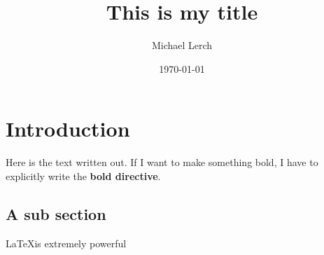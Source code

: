 \documentclass[10pt,letterpaper]{article}
\title{This is my title}
\author{Michael Lerch}
\date{\today}
\begin{document}
\maketitle


\section{Introduction}

Here is the text written out.
If I want to make something bold, I have to explicitly write the \textbf{bold directive}.

\subsection{A sub section}

\LaTeX is extremely powerful
\end{document}
